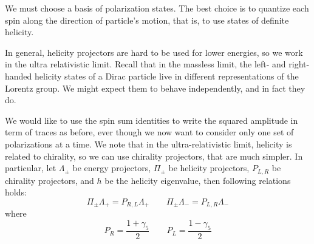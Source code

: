 \documentclass[TheoreticalPhy_ModB.tex]{subfiles}
\begin{document}
We must choose a basis of polarization states. The best choice is to quantize each spin along the direction of particle's motion, that is, to use states of definite helicity.

In general, helicity projectors are hard to be used for lower energies, so we work in the ultra relativistic limit. Recall that in the massless limit, the left- and right-handed helicity states of a Dirac particle live in different representations of the Lorentz group. We might expect them to behave independently, and in fact they do.

We would like to use the spin sum identities to write the squared amplitude in term of traces as before, ever though we now want to consider only one set of polarizations at a time. We note that in the ultra-relativistic limit, helicity is related to chirality, so we can use chirality projectors, that are much simpler. In particular, let $\Lambda_{\pm}$ be energy projectors, $\Pi_{\pm}$ be helicity projectors, $P_{L, R}$ be chirality projectors, and $h$ be the helicity eigenvalue, then following relations holds:
\[
\Pi_{\pm}\Lambda_+ = P_{R, L}\Lambda_+
\qquad
\Pi_{\pm}\Lambda_- = P_{L, R}\Lambda_-
\]
where
\[
P_R = \frac{1 + \gamma_5}{2}
\qquad
P_L = \frac{1 - \gamma_5}{2}
\]

\begin{comment} %
Then spinors in UR limit with definite helicity are:
\[\begin{aligned}
u_+ 	& = \Pi_+ \, u = u_1 = u_R \quad&&\to \quad\text{right handed spinor, } h = \frac{1}{2} \\
u_- 	& = \Pi_- \, u = u_2 = u_L 	&& \to \quad\text{left handed spinor, }	 h = -\frac{1}{2}
\end{aligned}\]

\begin{center}

\end{center}

\begin{align*}
v_+ 	& = \Pi_+ \, v = v_2 = v_L 	\quad&&\to \quad \text{left handed spinor, }	 h = \frac{1}{2} \\
v_- 	& = \Pi_- \, v = v_1 = v_R	&& \to \quad \text{right handed spinor, } h = -\frac{1}{2}
\end{align*}

\begin{center}

\end{center}
\end{comment}
\end{document}
